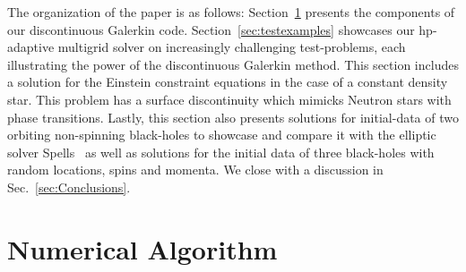 The organization of the paper is as follows: 
Section~\ref{sec:numericalalgorithm} presents the components of our
  discontinuous Galerkin code. Section~\ref{sec:testexamples} 
  showcases our hp-adaptive multigrid solver on  increasingly challenging test-problems, each
  illustrating the power of the discontinuous Galerkin method. This section includes a solution for the Einstein constraint equations in the case of a constant density star. This problem has a surface discontinuity which mimicks Neutron stars with phase transitions. Lastly, this section also presents solutions for
  initial-data of two orbiting non-spinning black-holes to
  showcase and compare it with the elliptic solver Spells~\cite{pfeiffer2003}
 as well as solutions for the initial data
  of three black-holes with random locations, spins and momenta.  We
  close with a discussion in Sec.~\ref{sec:Conclusions}.


\section{Numerical Algorithm}
\label{sec:numericalalgorithm}



